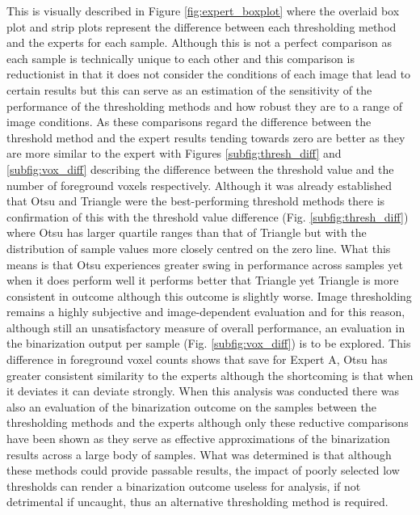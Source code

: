 \fi
This is visually described in Figure \ref{fig:expert_boxplot} where the overlaid box plot and strip plots represent the difference between each thresholding method and the experts for each sample. Although this is not a perfect comparison as each sample is technically unique to each other and this comparison is reductionist in that it does not consider the conditions of each image that lead to certain results but this can serve as an estimation of the sensitivity of the performance of the thresholding methods and how robust they are to a range of image conditions. As these comparisons regard the difference between the threshold method and the expert results tending towards zero are better as they are more similar to the expert with Figures \ref{subfig:thresh_diff} and \ref{subfig:vox_diff} describing the difference between the threshold value and the number of foreground voxels respectively. Although it was already established that Otsu and Triangle were the best-performing threshold methods there is confirmation of this with the threshold value difference (Fig. \ref{subfig:thresh_diff}) where Otsu has larger quartile ranges than that of Triangle but with the distribution of sample values more closely centred on the zero line. What this means is that Otsu experiences greater swing in performance across samples yet when it does perform well it performs better that Triangle yet Triangle is more consistent in outcome although this outcome is slightly worse. Image thresholding remains a highly subjective and image-dependent evaluation and for this reason, although still an unsatisfactory measure of overall performance, an evaluation in the binarization output per sample (Fig. \ref{subfig:vox_diff}) is to be explored. This difference in foreground voxel counts shows that save for Expert A, Otsu has greater consistent similarity to the experts although the shortcoming is that when it deviates it can deviate strongly. When this analysis was conducted there was also an evaluation of the binarization outcome on the samples between the thresholding methods and the experts although only these reductive comparisons have been shown as they serve as effective approximations of the binarization results across a large body of samples. What was determined is that although these methods could provide passable results, the impact of poorly selected low thresholds can render a binarization outcome useless for analysis, if not detrimental if uncaught, thus an alternative thresholding method is required.
